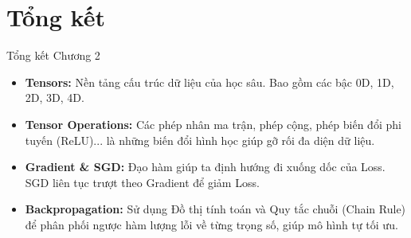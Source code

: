 \documentclass[aspectratio=169]{beamer}
\begin{document}
\section{Tổng kết}

\begin{frame}{Tổng kết Chương 2}
    \begin{itemize}
        \item \textbf{Tensors:} Nền tảng cấu trúc dữ liệu của học sâu. Bao gồm các bậc 0D, 1D, 2D, 3D, 4D.
        \item \textbf{Tensor Operations:} Các phép nhân ma trận, phép cộng, phép biến đổi phi tuyến (ReLU)... là những biến đổi hình học giúp gỡ rối đa diện dữ liệu.
        \item \textbf{Gradient \& SGD:} Đạo hàm giúp ta định hướng đi xuống dốc của Loss. SGD liên tục trượt theo Gradient để giảm Loss.
        \item \textbf{Backpropagation:} Sử dụng Đồ thị tính toán và Quy tắc chuỗi (Chain Rule) để phân phối ngược hàm lượng lỗi về từng trọng số, giúp mô hình tự tối ưu.
    \end{itemize}
\end{frame}
\end{document}
